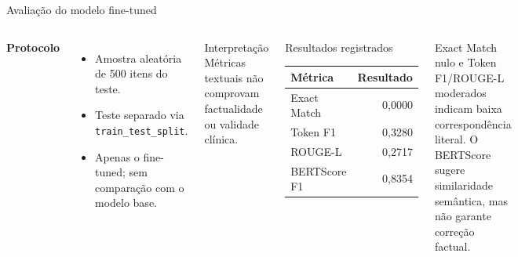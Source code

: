\documentclass[aspectratio=169,11pt]{beamer}
\begin{document}
\begin{frame}{Avaliação do modelo fine-tuned}
  \small
  \begin{columns}[T,onlytextwidth]
    \textbf{Protocolo}
    \begin{itemize}
      \item Amostra aleatória de 500 itens do teste.
      \item Teste separado via \texttt{train\_test\_split}.
      \item Apenas o fine-tuned; sem comparação com o modelo base.
    \end{itemize}
    \vspace{0.15cm}
    \begin{alertblock}{Interpretação}
      Métricas textuais não comprovam factualidade ou validade clínica.
    \end{alertblock}
    \begin{block}{Resultados registrados}
      \centering
      \begin{tabular}{lr}
        \toprule
        \textbf{Métrica} & \textbf{Resultado}\\
        \midrule
        Exact Match & 0,0000\\
        Token F1 & 0,3280\\
        ROUGE-L & 0,2717\\
        BERTScore F1 & 0,8354\\
        \bottomrule
      \end{tabular}
    \end{block}
    \vspace{0.15cm}
    \footnotesize Exact Match nulo e Token F1/ROUGE-L moderados indicam baixa correspondência literal. O BERTScore sugere similaridade semântica, mas não garante correção factual.
  \end{columns}
\end{frame}
\end{document}
